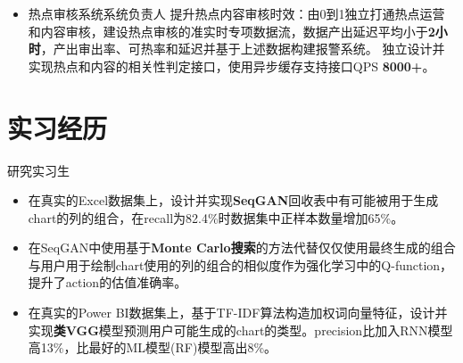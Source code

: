 \documentclass[11pt,a4paper]{moderncv}
\begin{document}
{\begin{itemize}
        \newline 独立建成可插拔全网竞品push监控系统，监控全网热点主要竞品首发率，头条热点push首发率提升\textbf{40\%}。
        \newline 设计并实现通用的并行和分批处理SDK供内部使用，线上代码仓库接入量\textbf{20+}。
        \item \textcolor[RGB]{64,127,191}{热点审核系统系统负责人}
        \newline 提升热点内容审核时效：由0到1独立打通热点运营和内容审核，建设热点审核的准实时专项数据流，数据产出延迟平均小于\textbf{2小时}，产出审出率、可热率和延迟并基于上述数据构建报警系统。
        \newline 独立设计并实现热点和内容的相关性判定接口，使用异步缓存支持接口QPS \textbf{8000+}。
    \end{itemize}}




\section{实习经历}

 {研究实习生}{}{}{
    \begin{itemize}
        \item 在真实的Excel数据集上，设计并实现\textbf{SeqGAN}回收表中有可能被用于生成chart的列的组合，在recall为82.4\%时数据集中正样本数量增加65\%。
        \item 在SeqGAN中使用基于\textbf{Monte Carlo搜索}的方法代替仅仅使用最终生成的组合与用户用于绘制chart使用的列的组合的相似度作为强化学习中的Q-function，提升了action的估值准确率。
        \item 在真实的Power BI数据集上，基于TF-IDF算法构造加权词向量特征，设计并实现\textbf{类VGG}模型预测用户可能生成的chart的类型。precision比加入RNN模型高13\%，比最好的ML模型(RF)模型高出8\%。%
    \end{itemize}}
\end{document}
